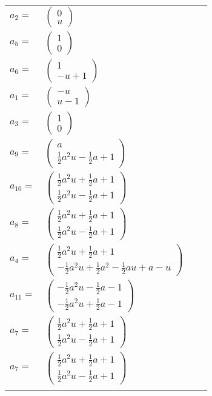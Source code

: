 \documentclass[1p]{elsarticle_modified}
\theoremstyle{definition}
\begin{document}
\begin{tabular}{m{7pt} m{180pt} m{7pt} m{180pt} }
\flushright $a_{2}=$&$\begin{pmatrix}0\\u\end{pmatrix}$ \\
\flushright $a_{5}=$&$\begin{pmatrix}1\\0\end{pmatrix}$ \\
\flushright $a_{6}=$&$\begin{pmatrix}1\\- u+1\end{pmatrix}$ \\
\flushright $a_{1}=$&$\begin{pmatrix}- u\\u-1\end{pmatrix}$ \\
\flushright $a_{3}=$&$\begin{pmatrix}1\\0\end{pmatrix}$ \\
\flushright $a_{9}=$&$\begin{pmatrix}a\\\frac{1}{2} a^2 u-\frac{1}{2} a+1\end{pmatrix}$ \\
\flushright $a_{10}=$&$\begin{pmatrix}\frac{1}{2} a^2 u+\frac{1}{2} a+1\\\frac{1}{2} a^2 u-\frac{1}{2} a+1\end{pmatrix}$ \\
\flushright $a_{8}=$&$\begin{pmatrix}\frac{1}{2} a^2 u+\frac{1}{2} a+1\\\frac{1}{2} a^2 u-\frac{1}{2} a+1\end{pmatrix}$ \\
\flushright $a_{4}=$&$\begin{pmatrix}\frac{1}{2} a^2 u+\frac{1}{2} a+1\\-\frac{1}{2} a^2 u+\frac{1}{2} a^2-\frac{1}{2} a u+a- u\end{pmatrix}$ \\
\flushright $a_{11}=$&$\begin{pmatrix}-\frac{1}{2} a^2 u-\frac{1}{2} a-1\\-\frac{1}{2} a^2 u+\frac{1}{2} a-1\end{pmatrix}$ \\
\flushright $a_{7}=$&$\begin{pmatrix}\frac{1}{2} a^2 u+\frac{1}{2} a+1\\\frac{1}{2} a^2 u-\frac{1}{2} a+1\end{pmatrix}$\\ \flushright $a_{7}=$&$\begin{pmatrix}\frac{1}{2} a^2 u+\frac{1}{2} a+1\\\frac{1}{2} a^2 u-\frac{1}{2} a+1\end{pmatrix}$\\&\end{tabular}
\end{document}
